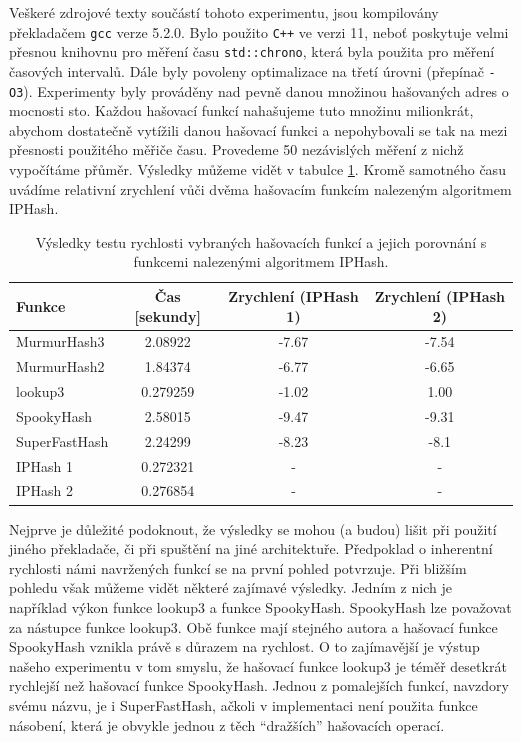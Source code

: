 Veškeré zdrojové texty součástí tohoto experimentu,
jsou kompilovány překladačem \texttt{gcc} verze 5.2.0. Bylo použito \texttt{C++} ve verzi 11, neboť poskytuje velmi
přesnou knihovnu pro měření času \texttt{std::chrono}, která byla použita pro měření časových intervalů. Dále byly
povoleny optimalizace na třetí úrovni (přepínač \texttt{-O3}). Experimenty byly prováděny nad pevně danou množinou
hašovaných adres o mocnosti sto. Každou hašovací funkcí nahašujeme tuto množinu milionkrát, abychom dostatečně 
vytížili danou hašovací funkci a nepohybovali se tak na mezi přesnosti použitého měřiče času. Provedeme 50 nezávislých
měření z nichž vypočítáme přůměr. Výsledky můžeme vidět v tabulce \ref{tab:speedcomparison}. Kromě samotného času
uvádíme relativní zrychlení vůči dvěma hašovacím funkcím nalezeným algoritmem IPHash.

\begin{table}[!ht]
	\centering
	\caption{Výsledky testu rychlosti vybraných hašovacích funkcí a jejich porovnání s funkcemi nalezenými algoritmem IPHash.}
	\begin{tabular}{lccc}
		\hline
		Funkce & Čas [sekundy]  & Zrychlení (IPHash 1) & Zrychlení (IPHash 2) \\ 
		\hline
		MurmurHash3   & 2.08922  & -7.67 & -7.54 \\
		MurmurHash2   & 1.84374  & -6.77 & -6.65 \\
		lookup3       & 0.279259 & -1.02 &  1.00 \\
		SpookyHash    & 2.58015  & -9.47 & -9.31 \\
		SuperFastHash & 2.24299  & -8.23 & -8.1  \\ 
		\hline
		IPHash 1      & 0.272321 & - & - \\
		IPHash 2      & 0.276854 & - & - \\
		\hline
	\end{tabular}	
	\label{tab:speedcomparison}
\end{table}

Nejprve je důležité podoknout, že výsledky se mohou (a budou) lišit při použití jiného překladače, či při spuštění na jiné
architektuře. Předpoklad o inherentní rychlosti námi navržených funkcí se na první pohled potvrzuje. Při bližším pohledu však
můžeme vidět některé zajímavé výsledky. Jedním z nich je například výkon funkce lookup3 a funkce SpookyHash. SpookyHash lze
považovat za nástupce funkce lookup3. Obě funkce mají stejného autora a hašovací funkce SpookyHash vznikla právě s důrazem
na rychlost. O to zajímavější je výstup našeho experimentu v tom smyslu, že hašovací funkce lookup3 je téměř desetkrát
rychlejší než hašovací funkce SpookyHash. Jednou z pomalejších funkcí, navzdory svému názvu, je i SuperFastHash, ačkoli v
implementaci není použita funkce násobení, která je obvykle jednou z těch ``dražších'' hašovacích operací. 

